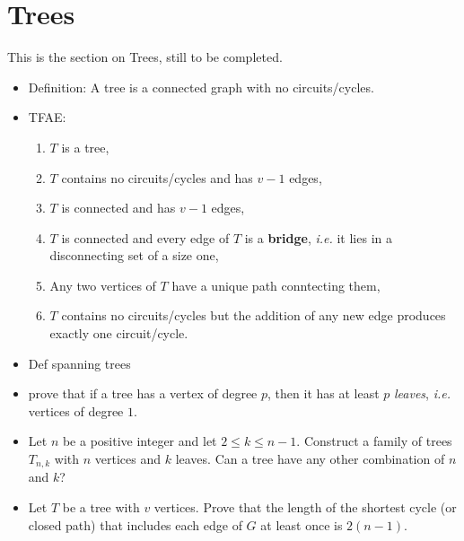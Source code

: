 \section{Trees}\label{sec:trees}

This is the section on Trees, still to be completed.

\begin{itemize}
    \item Definition: A tree is a connected graph with no circuits/cycles.
    \item TFAE:
    \begin{enumerate}
        \item $T$ is a tree,
        \item $T$ contains no circuits/cycles and has $v-1$ edges,
        \item $T$ is connected and has $v-1$ edges,
        \item $T$ is connected and every edge of $T$ is a \textbf{bridge}, \textit{i.e.} it lies in a disconnecting set of a size one,
        \item Any two vertices of $T$ have a unique path conntecting them,
        \item $T$ contains no circuits/cycles but the addition of any new edge produces exactly one circuit/cycle.
    \end{enumerate}
    \item Def spanning trees
    \item prove that if a tree has a vertex of degree $p$, then it has at least $p$ \textit{leaves}, \textit{i.e.} vertices of degree $1$.
    \item Let $n$ be a positive integer and let $2 \leq k \leq n-1$.  Construct a family of trees $T_{n,k}$ with $n$ vertices and $k$ leaves.  Can a tree have any other combination of $n$ and $k$?
    \item Let $T$ be a tree with $v$ vertices.  Prove that the length of the shortest cycle (or closed path) that includes each edge of $G$ at least once is $2(n-1)$.





\end{itemize}
